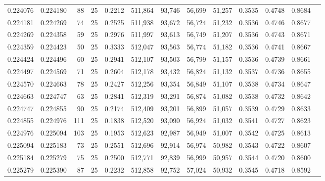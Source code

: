 \begin{tabular}{rrrrrrrrrrrrr}
0.224076 & 0.224180 &    88 &  25 &                                     0.2212 & 511,864 &  93,746 &  56,699 &  51,257 & 0.3535 & 0.4748 & 0.8684 \\
0.224181 & 0.224269 &    74 &  25 &                                     0.2525 & 511,938 &  93,672 &  56,724 &  51,232 & 0.3536 & 0.4746 & 0.8677 \\
0.224269 & 0.224358 &    59 &  25 &                                     0.2976 & 511,997 &  93,613 &  56,749 &  51,207 & 0.3536 & 0.4743 & 0.8671 \\
0.224359 & 0.224423 &    50 &  25 &                                     0.3333 & 512,047 &  93,563 &  56,774 &  51,182 & 0.3536 & 0.4741 & 0.8667 \\
0.224424 & 0.224496 &    60 &  25 &                                     0.2941 & 512,107 &  93,503 &  56,799 &  51,157 & 0.3536 & 0.4739 & 0.8661 \\
0.224497 & 0.224569 &    71 &  25 &                                     0.2604 & 512,178 &  93,432 &  56,824 &  51,132 & 0.3537 & 0.4736 & 0.8655 \\
0.224570 & 0.224663 &    78 &  25 &                                     0.2427 & 512,256 &  93,354 &  56,849 &  51,107 & 0.3538 & 0.4734 & 0.8647 \\
0.224663 & 0.224747 &    63 &  25 &                                     0.2841 & 512,319 &  93,291 &  56,874 &  51,082 & 0.3538 & 0.4732 & 0.8642 \\
0.224747 & 0.224855 &    90 &  25 &                                     0.2174 & 512,409 &  93,201 &  56,899 &  51,057 & 0.3539 & 0.4729 & 0.8633 \\
0.224855 & 0.224976 &   111 &  25 &                                     0.1838 & 512,520 &  93,090 &  56,924 &  51,032 & 0.3541 & 0.4727 & 0.8623 \\
0.224976 & 0.225094 &   103 &  25 &                                     0.1953 & 512,623 &  92,987 &  56,949 &  51,007 & 0.3542 & 0.4725 & 0.8613 \\
0.225094 & 0.225183 &    73 &  25 &                                     0.2551 & 512,696 &  92,914 &  56,974 &  50,982 & 0.3543 & 0.4722 & 0.8607 \\
0.225184 & 0.225279 &    75 &  25 &                                     0.2500 & 512,771 &  92,839 &  56,999 &  50,957 & 0.3544 & 0.4720 & 0.8600 \\
0.225279 & 0.225390 &    87 &  25 &                                     0.2232 & 512,858 &  92,752 &  57,024 &  50,932 & 0.3545 & 0.4718 & 0.8592 \\

\end{tabular}
